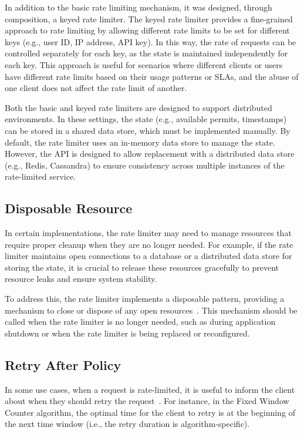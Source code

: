 In addition to the basic rate limiting mechanism, it was designed, through composition, a keyed rate limiter.
The keyed rate limiter provides a fine-grained approach to rate limiting
by allowing different rate limits to be set for different keys
(e.g., user ID, IP address, API key).
In this way, the rate of requests can be controlled separately for each key, as the state is maintained
independently for each key.
This approach is useful for scenarios
where different clients or users have different rate limits based on their usage patterns or SLAs,
and the abuse of one client does not affect the rate limit of another.

Both the basic and keyed rate limiters are designed to support distributed environments.
In these settings, the state (e.g., available permits, timestamps) can be stored in a shared data store,
which must be implemented manually.
By default, the rate limiter uses an in-memory data store to manage the state.
However,
the API is designed to allow replacement with a distributed data store
(e.g., Redis, Cassandra) to ensure consistency across multiple instances of the rate-limited service.

\subsection{Disposable Resource}\label{subsec:rate-limiter-disposable-resource}

In certain implementations, the rate limiter may need to manage resources that require proper cleanup when they are no longer needed.
For example, if the rate limiter maintains open connections to a database or a distributed data store
for storing the state, it is crucial to release these resources gracefully to prevent resource leaks and ensure system stability.

To address this, the rate limiter implements a disposable pattern,
providing a mechanism to close or dispose of any open resources~\cite{microsoft-dispose-pattern}. This mechanism should be called when the rate limiter is no longer needed, such as during application shutdown or when the rate limiter is being replaced or reconfigured.

\subsection{Retry After Policy}\label{subsec:rate-limiter-retry-after-policy}

In some use cases, when a request is rate-limited, it is useful to inform the client about when they should retry the request~\cite{mdn-retry-after}.
For instance, in the Fixed Window Counter algorithm,
the optimal time for the client to retry is at the beginning of the next time window
(i.e., the retry duration is algorithm-specific).

